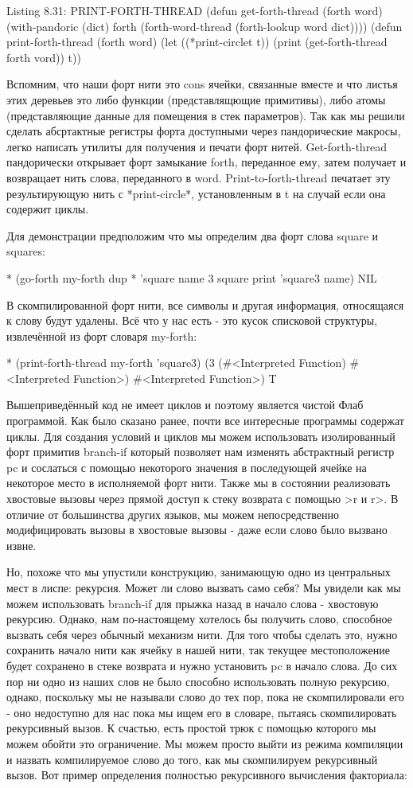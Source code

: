 {{{Listing 8.31: PRINT-FORTH-THREAD
(defun get-forth-thread (forth word)
(with-pandoric (dict) forth
(forth-word-thread
(forth-lookup word dict))))
(defun print-forth-thread (forth word)
(let ((*print-circlet t))
(print (get-forth-thread forth vord))
t))

Вспомним, что наши форт нити это cons ячейки, связанные вместе и что листья этих деревьев это либо функции (представлящющие примитивы), либо атомы (представляющие данные для помещения в стек параметров). Так как мы решили сделать абсртактные регистры форта доступными через пандорические макросы, легко написать утилиты для получения и печати форт нитей. Get-forth-thread пандорически открывает форт замыкание forth, переданное ему, затем получает и возвращает нить слова, переданного в word. Print-to-forth-thread печатает эту результирующую нить с *print-circle*, установленным в t на случай если она содержит циклы.

Для демонстрации предположим что мы определим два форт слова square и squares:

* (go-forth my-forth
{ dup * } ’square name
{ 3 square print } ’square3 name)
NIL

В скомпилированной форт нити, все символы и другая информация, относящаяся к слову будут удалены. Всё что у нас есть - это кусок списковой структуры, извлечённой из форт словаря my-forth:

* (print-forth-thread my-forth ’square3)
(3
(#<Interpreted Function)
#<Interpreted Function>)
#<Interpreted Function>)
T

Вышеприведённый код не имеет циклов и поэтому является чистой Флаб программой. Как было сказано ранее, почти все интересные программы содержат циклы. Для создания условий и циклов мы можем использовать изолированный форт примитив branch-if который позволяет нам изменять абстрактный регистр pc и сослаться с помощью некоторого значения в последующей ячейке на некоторое место в исполняемой форт нити. Также мы в состоянии реализовать хвостовые вызовы через прямой доступ к стеку возврата с помощью >r и r>. В отличие от большинства других языков, мы можем непосредственно модифицировать вызовы в хвостовые вызовы - даже если слово было вызвано извне.

Но, похоже что мы упустили конструкцию, занимающую одно из центральных мест в лиспе: рекурсия. Может ли слово вызвать само себя? Мы увидели как мы можем использовать branch-if для прыжка назад в начало слова - хвостовую рекурсию. Однако, нам по-настоящему хотелось бы получить слово, способное вызвать себя через обычный механизм нити. Для того чтобы сделать это, нужно сохранить начало нити как ячейку в нашей нити, так текущее местоположение будет сохранено в стеке возврата и нужно установить pc в начало слова. До сих пор ни одно из наших слов не было способно использовать полную рекурсию, однако, поскольку мы не называли слово до тех пор, пока не скомпилировали его - оно недоступно для нас пока мы ищем его в словаре, пытаясь скомпилировать рекурсивный вызов. К счастью, есть простой трюк с помощью которого мы можем обойти это ограничение. Мы можем просто выйти из режима компиляции и назвать компилируемое слово до того, как мы скомпилируем рекурсивный вызов. Вот пример определения полностью рекурсивного вычисления факториала:

}}}
